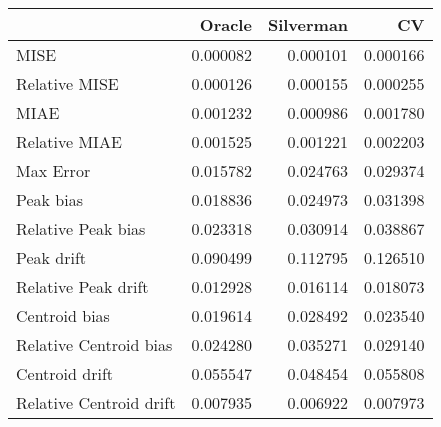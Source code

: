 \begin{tabular}{lrrr}
  \hline
 & Oracle & Silverman & CV \\ 
  \hline
MISE & 0.000082 & 0.000101 & 0.000166 \\ 
  Relative MISE & 0.000126 & 0.000155 & 0.000255 \\ 
  MIAE & 0.001232 & 0.000986 & 0.001780 \\ 
  Relative MIAE & 0.001525 & 0.001221 & 0.002203 \\ 
  Max Error & 0.015782 & 0.024763 & 0.029374 \\ 
  Peak bias & 0.018836 & 0.024973 & 0.031398 \\ 
  Relative Peak bias & 0.023318 & 0.030914 & 0.038867 \\ 
  Peak drift & 0.090499 & 0.112795 & 0.126510 \\ 
  Relative Peak drift & 0.012928 & 0.016114 & 0.018073 \\ 
  Centroid bias & 0.019614 & 0.028492 & 0.023540 \\ 
  Relative Centroid bias & 0.024280 & 0.035271 & 0.029140 \\ 
  Centroid drift & 0.055547 & 0.048454 & 0.055808 \\ 
  Relative Centroid drift & 0.007935 & 0.006922 & 0.007973 \\ 
   \hline
\end{tabular}
